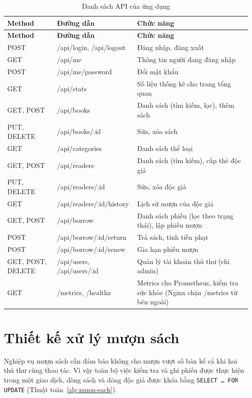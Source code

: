 \documentclass[../main.tex]{subfiles}
\begin{document}
\begin{longtable}{|p{2.1cm}|p{5.2cm}|p{6.9cm}|}
\caption{Danh sách API của ứng dụng}
\label{tab:api}\\
\hline
\textbf{Method} & \textbf{Đường dẫn} & \textbf{Chức năng} \\
\hline
\endfirsthead
\hline
\textbf{Method} & \textbf{Đường dẫn} & \textbf{Chức năng} \\
\hline
\endhead
POST & /api/login, /api/logout & Đăng nhập, đăng xuất \\ \hline
GET & /api/me & Thông tin người đang đăng nhập \\ \hline
POST & /api/me/password & Đổi mật khẩu \\ \hline
GET & /api/stats & Số liệu thống kê cho trang tổng quan \\ \hline
GET, POST & /api/books & Danh sách (tìm kiếm, lọc), thêm sách \\ \hline
PUT, DELETE & /api/books/:id & Sửa, xóa sách \\ \hline
GET & /api/categories & Danh sách thể loại \\ \hline
GET, POST & /api/readers & Danh sách (tìm kiếm), cấp thẻ độc giả \\ \hline
PUT, DELETE & /api/readers/:id & Sửa, xóa độc giả \\ \hline
GET & /api/readers/:id/history & Lịch sử mượn của độc giả \\ \hline
GET, POST & /api/borrow & Danh sách phiếu (lọc theo trạng thái), lập phiếu mượn \\ \hline
POST & /api/borrow/:id/return & Trả sách, tính tiền phạt \\ \hline
POST & /api/borrow/:id/renew & Gia hạn phiếu mượn \\ \hline
GET, POST, DELETE & /api/users, /api/users/:id & Quản lý tài khoản thủ thư (chỉ admin) \\ \hline
GET & /metrics, /healthz & Metrics cho Prometheus, kiểm tra sức khỏe (Nginx chặn /metrics từ bên ngoài) \\ \hline
\end{longtable}

\section{Thiết kế xử lý mượn sách}
Nghiệp vụ mượn sách cần đảm bảo không cho mượn vượt số bản kể cả khi hai thủ thư cùng thao tác. Vì vậy toàn bộ việc kiểm tra và ghi phiếu được thực hiện trong một giao dịch, dòng sách và dòng độc giả được khóa bằng \texttt{SELECT \ldots{} FOR UPDATE} (Thuật toán~\ref{alg:muon-sach}).
\end{document}
